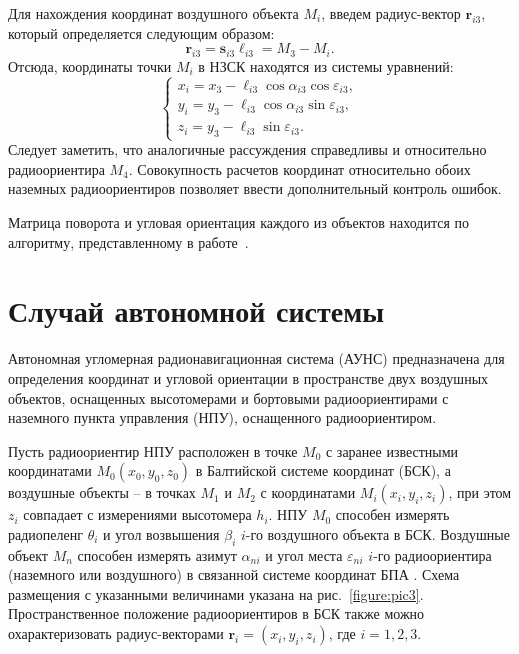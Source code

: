 \documentclass[a4paper,12pt]{article}
\begin{document}
Для нахождения координат воздушного объекта $M_i$, введем радиус-вектор $\mathbf{r}_{i3}$, который определяется следующим
образом:
\begin{equation}
    \mathbf{r}_{i3} = \mathbf{s}_{i3} \ell_{i3} = M_3 - M_i.
\end{equation}
Отсюда, координаты точки $M_i$ в НЗСК находятся из системы уравнений:
\begin{equation}
    \begin{cases}
        x_i = x_3 - \ell_{i3} \cos\alpha_{i3} \cos\varepsilon_{i3}, \\
        y_i = y_3 - \ell_{i3} \cos\alpha_{i3} \sin\varepsilon_{i3}, \\
        z_i = y_3 - \ell_{i3} \sin\varepsilon_{i3}.
    \end{cases}
\end{equation}
Следует заметить, что аналогичные рассуждения справедливы и относительно радиоориентира $M_4$. Совокупность
расчетов координат относительно обоих наземных радиоориентиров позволяет ввести дополнительный контроль ошибок.

Матрица поворота и угловая ориентация каждого из объектов находится по алгоритму, представленному в работе~\cite{antennas}.

\section{Случай автономной системы}
Автономная угломерная радионавигационная система (АУНС) предназначена для определения
координат и угловой ориентации в пространстве двух воздушных объектов, оснащенных
высотомерами и бортовыми радиоориентирами с наземного пункта управления (НПУ),
оснащенного радиоориентиром.

Пусть радиоориентир НПУ расположен в точке $M_0$ с заранее известными координатами
$M_0\left(x_0, y_0, z_0\right)$ в Балтийской системе координат (БСК), а воздушные объекты
-- в точках $M_1$ и $M_2$ с координатами $M_i\left(x_i, y_i, z_i\right)$, при этом $z_i$
совпадает с измерениями высотомера $h_i$. НПУ $M_0$ способен измерять радиопеленг $\theta_i$
и угол возвышения $\beta_i$ $i$-го воздушного объекта в БСК. Воздушные объект $M_n$
способен измерять азимут $\alpha_{ni}$ и угол места $\varepsilon_{ni}$ $i$-го
радиоориентира (наземного или воздушного) в связанной системе координат БПА \cite{antennas}.
Схема размещения с указанными величинами указана на рис.~\ref{figure:pic3}.
Пространственное положение радиоориентиров в БСК также можно охарактеризовать радиус-векторами
$\mathbf{r}_i = \left(x_i, y_i, z_i\right)$, где $i = 1,2,3$.
\end{document}
